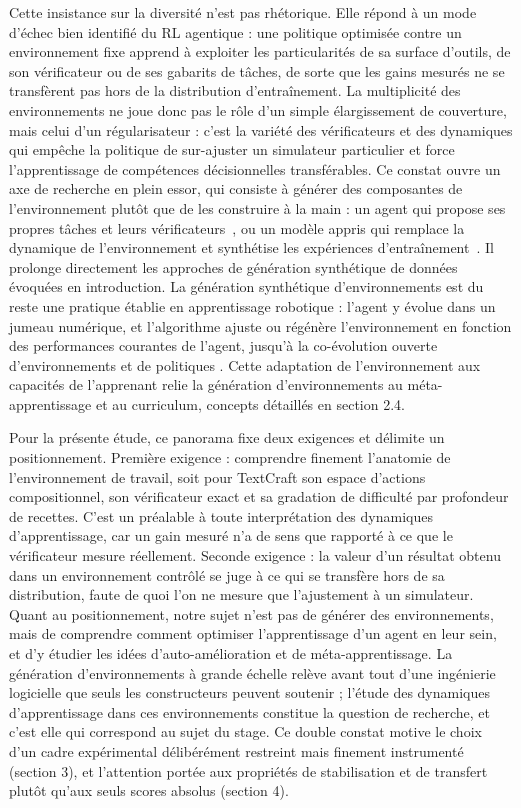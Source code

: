 \documentclass[11pt,a4paper]{article}
\begin{document}
Cette insistance sur la diversité n'est pas rhétorique. Elle répond à un mode d'échec bien identifié du RL agentique : une politique optimisée contre un environnement fixe apprend à exploiter les particularités de sa surface d'outils, de son vérificateur ou de ses gabarits de tâches, de sorte que les gains mesurés ne se transfèrent pas hors de la distribution d'entraînement. La multiplicité des environnements ne joue donc pas le rôle d'un simple élargissement de couverture, mais celui d'un régularisateur : c'est la variété des vérificateurs et des dynamiques qui empêche la politique de sur-ajuster un simulateur particulier et force l'apprentissage de compétences décisionnelles transférables. Ce constat ouvre un axe de recherche en plein essor, qui consiste à générer des composantes de l'environnement plutôt que de les construire à la main : un agent qui propose ses propres tâches et leurs vérificateurs~\cite{zhou2025sca}, ou un modèle appris qui remplace la dynamique de l'environnement et synthétise les expériences d'entraînement~\cite{dreamgym2025}. Il prolonge directement les approches de génération synthétique de données évoquées en introduction. La génération synthétique d'environnements est du reste une pratique établie en apprentissage robotique : l'agent y évolue dans un jumeau numérique, et l'algorithme ajuste ou régénère l'environnement en fonction des performances courantes de l'agent, jusqu'à la co-évolution ouverte d'environnements et de politiques \cite{wang2019poet}. Cette adaptation de l'environnement aux capacités de l'apprenant relie la génération d'environnements au méta-apprentissage et au curriculum, concepts détaillés en section 2.4.

Pour la présente étude, ce panorama fixe deux exigences et délimite un positionnement. Première exigence : comprendre finement l'anatomie de l'environnement de travail, soit pour TextCraft son espace d'actions compositionnel, son vérificateur exact et sa gradation de difficulté par profondeur de recettes. C'est un préalable à toute interprétation des dynamiques d'apprentissage, car un gain mesuré n'a de sens que rapporté à ce que le vérificateur mesure réellement. Seconde exigence : la valeur d'un résultat obtenu dans un environnement contrôlé se juge à ce qui se transfère hors de sa distribution, faute de quoi l'on ne mesure que l'ajustement à un simulateur. Quant au positionnement, notre sujet n'est pas de générer des environnements, mais de comprendre comment optimiser l'apprentissage d'un agent en leur sein, et d'y étudier les idées d'auto-amélioration et de méta-apprentissage. La génération d'environnements à grande échelle relève avant tout d'une ingénierie logicielle que seuls les constructeurs peuvent soutenir ; l'étude des dynamiques d'apprentissage dans ces environnements constitue la question de recherche, et c'est elle qui correspond au sujet du stage. Ce double constat motive le choix d'un cadre expérimental délibérément restreint mais finement instrumenté (section 3), et l'attention portée aux propriétés de stabilisation et de transfert plutôt qu'aux seuls scores absolus (section 4).
\end{document}
